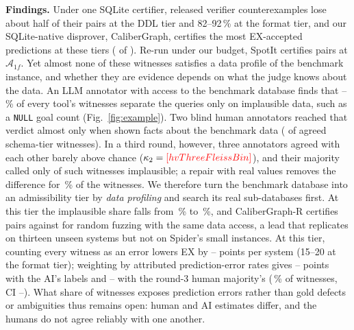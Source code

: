 \textbf{Findings.} Under one SQLite certifier, released verifier counterexamples lose about half of their pairs at the DDL tier and 82--92\,\% at the format tier, and our SQLite-native disprover, CaliberGraph, certifies the most EX-accepted predictions at these tiers ( of ). Re-run under our budget, SpotIt certifies  pairs at $\mathcal A_{1f}$. Yet almost none of these witnesses satisfies a data profile of the benchmark instance, and whether they are evidence depends on what the judge knows about the data. An LLM annotator with access to the benchmark database finds that --\,\% of every tool's witnesses separate the queries only on implausible data, such as a \texttt{NULL} goal count (Fig.~\ref{fig:example}). Two blind human annotators reached that verdict almost only when shown facts about the benchmark data ( of  agreed schema-tier witnesses). In a third round, however, three annotators agreed with each other barely above chance ($\kappa_2=\V{hvThreeFleissBin}$), and their majority called only  of  such witnesses implausible; a repair with real values removes the difference for \,\% of the witnesses. We therefore turn the benchmark database into an admissibility tier by \emph{data profiling} and search its real sub-databases first. At this tier the implausible share falls from \,\% to \,\%, and CaliberGraph-R certifies  pairs against  for random fuzzing with the same data access, a lead that replicates on thirteen unseen systems but not on Spider's small instances. At this tier, counting every witness as an error lowers EX by -- points per system (15--20 at the format tier); weighting by attributed prediction-error rates gives -- points with the AI's labels and -- with the round-3 human majority's (\,\% of witnesses, CI --). What share of witnesses exposes prediction errors rather than gold defects or ambiguities thus remains open: human and AI estimates differ, and the humans do not agree reliably with one another.

